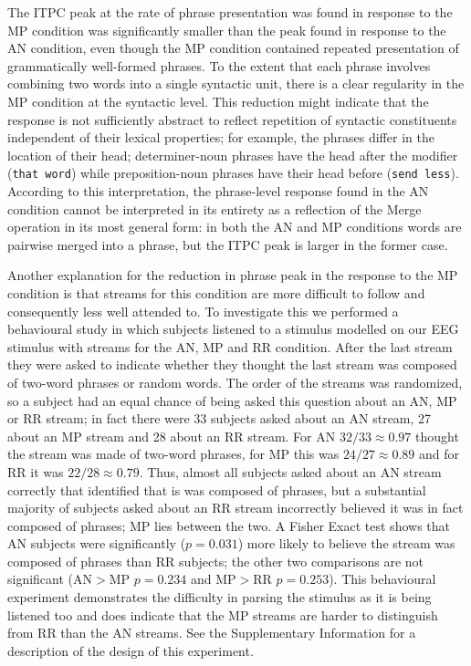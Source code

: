 \documentclass[10pt,letterpaper]{article}
\newcommand{\citet}[1]{\cite{#1}}
\begin{document}
The ITPC peak at the rate of phrase presentation was found in response
to the MP condition was significantly smaller than the peak found in
response to the AN condition, even though the MP condition contained
repeated presentation of grammatically well-formed phrases. To the
extent that each phrase involves combining two words into a single
syntactic unit, there is a clear regularity in the MP condition at the
syntactic level. This reduction might indicate that the response is
not sufficiently abstract to reflect repetition of syntactic
constituents independent of their lexical properties; for example, the
phrases differ in the location of their head; determiner-noun phrases
have the head after the modifier (\texttt{that word}) while
preposition-noun phrases have their head before (\texttt{send
  less}). According to this interpretation, the phrase-level response
found in the AN condition cannot be interpreted in its entirety as a
reflection of the Merge operation \citet{Chomsky1995} in its most
general form: in both the AN and MP conditions words are pairwise
merged into a phrase, but the ITPC peak is larger in the former case.


Another explanation for the reduction in phrase peak in the response
to the MP condition is that streams for this condition are more
difficult to follow and consequently less well attended to. To
investigate this we performed a behavioural study in which subjects
listened to a stimulus modelled on our EEG stimulus with streams for
the AN, MP and RR condition. After the last stream they were asked to
indicate whether they thought the last stream was composed of two-word
phrases or random words. The order of the streams was randomized, so a
subject had an equal chance of being asked this question about an AN,
MP or RR stream; in fact there were 33 subjects asked about an AN
stream, 27 about an MP stream and 28 about an RR stream. For AN
$32/33\approx 0.97$ thought the stream was made of two-word phrases,
for MP this was $24/27\approx 0.89$ and for RR it was $22/28\approx
0.79$. Thus, almost all subjects asked about an AN stream correctly
that identified that is was composed of phrases, but a substantial
majority of subjects asked about an RR stream incorrectly believed it
was in fact composed of phrases; MP lies between the two. A Fisher
Exact test shows that AN subjects were significantly ($p=0.031$) more
likely to believe the stream was composed of phrases than RR subjects;
the other two comparisons are not significant (AN$>$MP $p=0.234$ and
MP$>$RR $p=0.253$). This behavioural experiment demonstrates the
difficulty in parsing the stimulus as it is being listened too and
does indicate that the MP streams are harder to distinguish from RR
than the AN streams. See the Supplementary Information for a
description of the design of this experiment.
\end{document}
